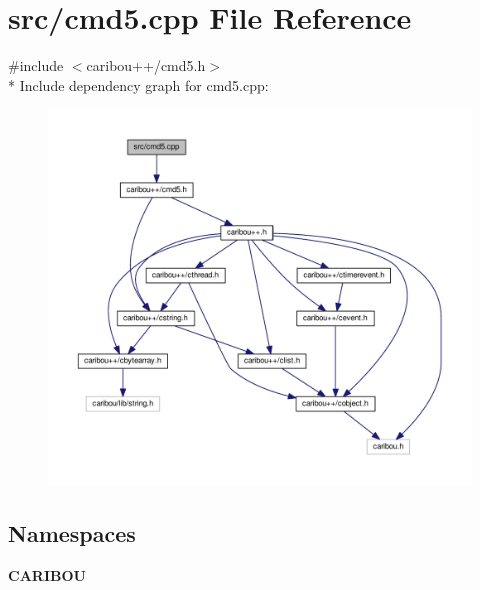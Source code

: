 \section{src/cmd5.cpp File Reference}
\label{cmd5_8cpp}
{\ttfamily \#include $<$caribou++/cmd5.\-h$>$}\\*
Include dependency graph for cmd5.\-cpp\-:\nopagebreak
\begin{figure}[H]
\begin{center}
\leavevmode
\includegraphics[width=350pt]{cmd5_8cpp__incl}
\end{center}
\end{figure}
\subsection*{Namespaces}
\begin{DoxyCompactItemize}
\item 
{\bf C\-A\-R\-I\-B\-O\-U}
\end{DoxyCompactItemize}
